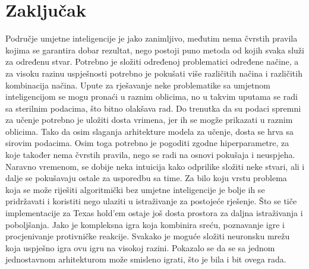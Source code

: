 \section{Zaključak}
Područje umjetne inteligencije je jako zanimljivo, međutim nema čvrstih pravila kojima se garantira dobar rezultat, nego postoji puno metoda od kojih svaka služi za određenu stvar. Potrebno je složiti određenoj problematici određene načine, a za visoku razinu uspješnosti potrebno je pokušati više različitih načina i različitih kombinacija načina. Upute za rješavanje neke problematike sa umjetnom inteligencijom se mogu pronaći u raznim oblicima, no u takvim uputama se radi sa sterilnim podacima, što bitno olakšava rad. Do trenutka da su podaci spremni za učenje potrebno je uložiti dosta vrimena, jer ih se mogže prikazati u raznim oblicima. Tako da osim slaganja arhitekture modela za učenje, dosta se hrva sa sirovim podacima. Osim toga potrebno je pogoditi zgodne hiperparametre, za koje također nema čvrstih pravila, nego se radi na osnovi pokušaja i neuspjeha. Naravno vremenom, se dobije neka intuicija kako odprilike složiti neke stvari, ali i dalje se pokušavaju ostale za usporedbu sa time. Za bilo koju vrstu problema koja se može riješiti algoritmički bez umjetne inteligencije je bolje ih se pridržavati i koristiti nego ulaziti u istraživanje za postojeće rješenje. Što se tiče implementacije za Texas hold'em ostaje još dosta prostora za daljna istraživanja i poboljšanja. Jako je kompleksna igra koja kombinira sreću, poznavanje igre i procjenivanje protivničke reakcije. Svakako je moguće složiti neuronsku mrežu koja uspješno igra ovu igru na visokoj razini. Pokazalo se da se sa jednom jednostavnom arhitekturom može smisleno igrati, što je bila i bit ovega rada.
